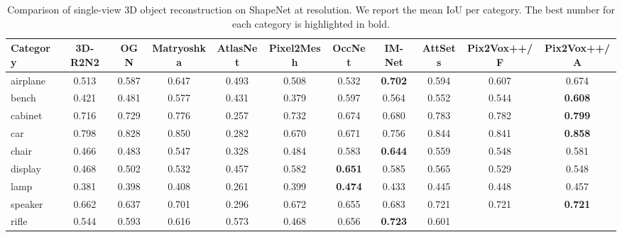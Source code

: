 \documentclass[twocolumn]{svjour3}
\begin{document}
\begin{table*}[!t]
  \caption{Comparison of single-view 3D object reconstruction on ShapeNet at  resolution. We report the mean IoU per category. The best number for each category is highlighted in bold.}
  \resizebox{\linewidth}{!} {
    \begin{tabular}{lcccccccccc}
      \toprule
      Category     & 3D-R2N2    & OGN        & Matryoshka
                   & AtlasNet   & Pixel2Mesh & OccNet
                   & IM-Net     & AttSets    
                   & Pix2Vox++/F& Pix2Vox++/A \\
      \midrule
      airplane     & 0.513      & 0.587      & 0.647
                   & 0.493      & 0.508      & 0.532
                   & \bf{0.702} & 0.594
                   & 0.607      & 0.674 \\
      bench        & 0.421      & 0.481      & 0.577
                   & 0.431      & 0.379      & 0.597
                   & 0.564      & 0.552
                   & 0.544      & \bf{0.608} \\
      cabinet      & 0.716      & 0.729      & 0.776
                   & 0.257      & 0.732      & 0.674
                   & 0.680      & 0.783
                   & 0.782      & \bf{0.799} \\
      car          & 0.798      & 0.828      & 0.850
                   & 0.282      & 0.670      & 0.671
                   & 0.756      & 0.844
                   & 0.841      & \bf{0.858} \\
      chair        & 0.466      & 0.483      & 0.547
                   & 0.328      & 0.484      & 0.583
                   & \bf{0.644} & 0.559
                   & 0.548      & 0.581 \\
      display      & 0.468      & 0.502      & 0.532
                   & 0.457      & 0.582      & \bf{0.651}
                   & 0.585      & 0.565
                   & 0.529      & 0.548 \\
      lamp         & 0.381      & 0.398      & 0.408
                   & 0.261      & 0.399      & \bf{0.474}
                   & 0.433      & 0.445
                   & 0.448      & 0.457 \\
      speaker      & 0.662      & 0.637      & 0.701
                   & 0.296      & 0.672      & 0.655
                   & 0.683      & 0.721
                   & 0.721      & \bf{0.721} \\
      rifle        & 0.544      & 0.593      & 0.616
                   & 0.573      & 0.468      & 0.656
                   & \bf{0.723} & 0.601

\end{tabular}}
\end{table*}
\end{document}
